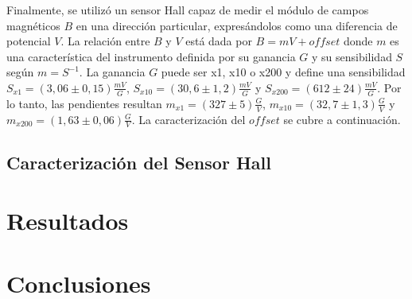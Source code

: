 \documentclass[11pt,a4paper]{article}
\begin{document}
Finalmente, se utilizó un sensor Hall capaz de medir el módulo de campos magnéticos $B$ en una dirección particular, expresándolos como una diferencia de potencial $V$. La relación entre $B$ y $V$ está dada por $B = mV+offset$ donde $m$ es una característica del instrumento definida por su ganancia $G$ y su sensibilidad $S$ según $m = S^{-1}$. La ganancia $G$ puede ser x1, x10 o x200 y define una sensibilidad $S_{x1} = (3,06 \pm 0,15)\frac{mV}{G}$,  $S_{x10} = (30,6 \pm 1,2)\frac{mV}{G}$ y $S_{x200} = (612 \pm 24)\frac{mV}{G}$. Por lo tanto, las pendientes resultan $m_{x1} = (327 \pm 5)\frac{G}{V}$, $m_{x10} = (32,7 \pm 1,3)\frac{G}{V}$ y $m_{x200} = (1,63 \pm 0,06)\frac{G}{V}$. La caracterización del $offset$ se cubre a continuación.

\subsection{Caracterización del Sensor Hall}




\section{Resultados}
\label{sec:discusion}






\section{Conclusiones}
\label{sec:conclusiones}






\end{document}
